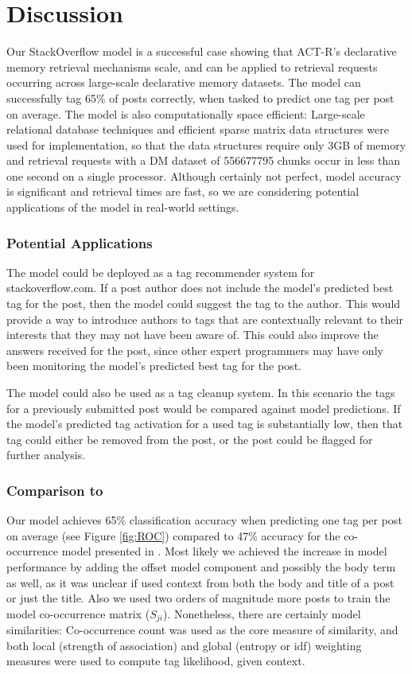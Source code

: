 \documentclass[10pt,letterpaper]{article}
\begin{document}
\section{Discussion}

Our StackOverflow model is a successful case showing that ACT-R's declarative memory retrieval mechanisms scale, and can be applied to retrieval requests occurring across large-scale declarative memory datasets. 
The model can successfully tag 65\% of posts correctly, when tasked to predict one tag per post on average.
The model is also computationally space efficient:
Large-scale relational database techniques and efficient sparse matrix data structures were used for implementation,
so that the data structures require only 3GB of memory and retrieval requests with a DM dataset of \num{556677795} chunks occur in less than one second on a single processor.
Although certainly not perfect, model accuracy is significant and retrieval times are fast, so we are considering potential applications of the model in real-world settings.

\subsubsection{Potential Applications}

The model could be deployed as a tag recommender system for stackoverflow.com. 
If a post author does not include the model's predicted best tag for the post, then the model could suggest the tag to the author.
This would provide a way to introduce authors to tags that are contextually relevant to their interests that they may not have been aware of.
This could also improve the answers received for the post, since other expert programmers may have only been monitoring the model's predicted best tag for the post.

The model could also be used as a tag cleanup system.
In this scenario the tags for a previously submitted post would be compared against model predictions.
If the model's predicted tag activation for a used tag is substantially low, then that tag could either be removed from the post, or the post could be flagged for further analysis.

\subsubsection{Comparison to }

Our model achieves 65\% classification accuracy when predicting one tag per post on average (see Figure \ref{fig:ROC})
compared to 47\% accuracy for the co-occurrence model presented in .
Most likely we achieved the increase in model performance by adding the offset model component and possibly the body term as well, 
as it was unclear if \citeauthor{Kuo2011} used context from both the body and title of a post or just the title.
Also we used two orders of magnitude more posts to train the model co-occurrence matrix ($S_{ji}$).
Nonetheless, there are certainly model similarities:
Co-occurrence count was used as the core measure of similarity, and both local (strength of association) and global (entropy or idf) weighting measures were used to compute tag likelihood, given context.
\end{document}
